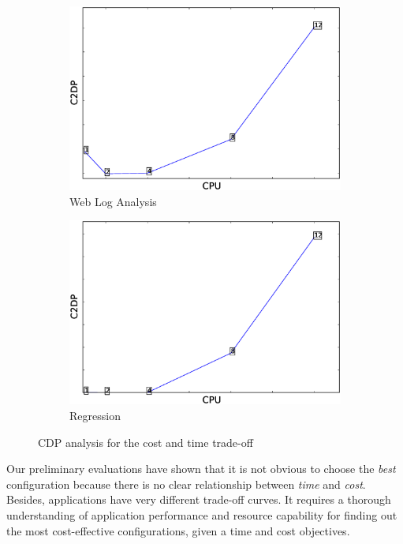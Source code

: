 \begin{figure}
\begin{subfigure}[b]{0.3\textwidth}
        \includegraphics[width=\textwidth]{Chapter-8/figures/webloganalysis_cpu_C2DP_12_1.eps}
        \caption{Web Log Analysis}
        \label{fig:webloganalysis_c2dp}
    \end{subfigure}
    \begin{subfigure}[b]{0.3\textwidth}
        \includegraphics[width=\textwidth]{Chapter-8/figures/regression_cpu_C2DP_12_1.eps}
        \caption{Regression}
        \label{fig:regression_c2dp}
    \end{subfigure}
    \caption{CDP analysis for the cost and time trade-off}
    \label{fig:cdp_analysis}
\end{figure}
\fi



Our preliminary evaluations have shown that
it is not obvious to choose the \emph{best} configuration
because there is no clear relationship between \emph{time} and \emph{cost}.
Besides, applications have very different trade-off curves.
It requires a thorough understanding of application performance and resource capability
for finding out the most cost-effective configurations,
given a time and cost objectives.

\fi

